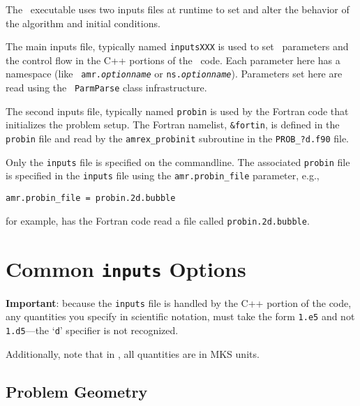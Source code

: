 The \iamr\ executable uses two inputs files at runtime to set and alter the
behavior of the algorithm and initial conditions.

The main inputs file, typically named {\tt inputsXXX} is used to
set \amrex\ parameters and the control flow in the C++ portions of
the \iamr\ code.  Each parameter here has a namespace (like {\tt
amr.{\em optionname}} or {\tt ns.{\em optionname}}).  Parameters
set here are read using the \amrex\ {\tt ParmParse} class
infrastructure.

The second inputs file, typically named {\tt probin} is used by the
Fortran code that initializes the problem setup.  
The Fortran namelist, {\tt \&fortin}, is defined in the {\tt probin} file
and read by the {\tt amrex\_probinit} subroutine in the {\tt PROB\_?d.f90} file.

Only the {\tt inputs} file is specified on the commandline.  The
associated {\tt probin} file is specified in the {\tt inputs} file
using the {\tt amr.probin\_file} parameter, e.g.,
\begin{lstlisting}
amr.probin_file = probin.2d.bubble
\end{lstlisting}
for example, has the Fortran code read a file called {\tt probin.2d.bubble}.

\section{Common {\tt inputs} Options}

{\bf Important}: because the {\tt inputs} file is handled by the C++ portion of
the code, any quantities you specify in scientific notation, must take the
form {\tt 1.e5} and not {\tt 1.d5}---the `{\tt d}' specifier is not recognized.

Additionally, note that in \iamr, all quantities are in MKS units.

\subsection{Problem Geometry}

